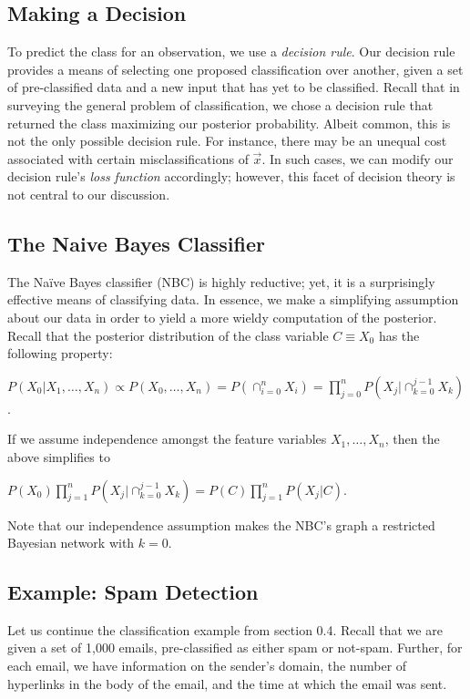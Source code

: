 \documentclass[12pt,twoside]{reedthesis}
\begin{document}
		\subsection*{Making a Decision}
	
	To predict the class for an observation, we use a {\em decision rule}.
	Our decision rule provides a means of selecting one proposed classification over another, given a set of pre-classified data and a new input that has yet to be classified.
	Recall that in surveying the general problem of classification, we chose a decision rule that returned the class maximizing our posterior probability. 
	Albeit common, this is not the only possible decision rule. 
	For instance, there may be an unequal cost associated with certain misclassifications of $\vec{x}$. In such cases, we can modify our decision rule's {\em loss function} accordingly; however, this facet of decision theory is not central to our discussion.
	 
	\subsection*{The Naive Bayes Classifier} %
	The Na\"{i}ve Bayes classifier (NBC) is highly reductive; yet, it is a surprisingly effective means of classifying data. 
	In essence, we make a simplifying assumption about our data in order to yield a more wieldy computation of the posterior.
	Recall that the posterior distribution of the class variable $C \equiv X_0$ has the following property:
	\begin{center}
		$P(X_0 | X_1, \ldots , X_n) \propto
		P(X_0,\ldots,X_n) = 
		P( \displaystyle\cap_{i=0}^{n} X_i) = 
		\displaystyle\prod_{j=0}^{n} P(X_j | \displaystyle\cap_{k=0}^{j-1}X_k)$.
	\end{center}
	If we assume independence amongst the feature variables $X_1,\ldots,X_n$, then the above simplifies to
	\begin{center}
		$P(X_0) \displaystyle\prod_{j=1}^{n} P(X_j | \displaystyle\cap_{k=0}^{j-1}X_k)
		= P(C) \displaystyle\prod_{j=1}^{n} P(X_j | C)$.
	\end{center}
	Note that our independence assumption makes the NBC's graph a restricted Bayesian network with $k = 0$.
	\subsection*{Example: Spam Detection}
	Let us continue the classification example from section 0.4. Recall that we are given a set of 1,000 emails, pre-classified as either spam or not-spam. Further, for each email, we have information on the sender's domain, the number of hyperlinks in the body of the email, and the time at which the email was sent. 
	
\end{document}
